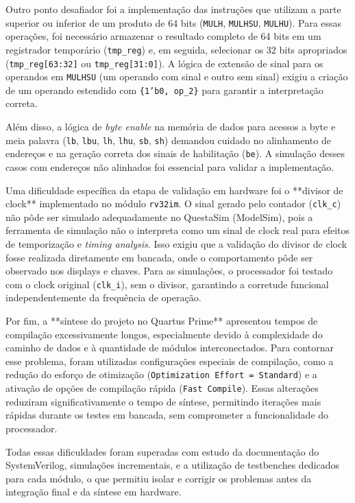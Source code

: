 \documentclass[
	12pt,				%
	oneside,
	a4paper,			%
	english,			%
	french,				%
	spanish,			%
	brazil,				%
	]{abntex2}
\begin{document}
Outro ponto desafiador foi a implementação das instruções que utilizam a parte superior ou inferior de um produto de 64 bits (\texttt{MULH}, \texttt{MULHSU}, \texttt{MULHU}). Para essas operações, foi necessário armazenar o resultado completo de 64 bits em um registrador temporário (\texttt{tmp\_reg}) e, em seguida, selecionar os 32 bits apropriados (\texttt{tmp\_reg[63:32]} ou \texttt{tmp\_reg[31:0]}). A lógica de extensão de sinal para os operandos em \texttt{MULHSU} (um operando com sinal e outro sem sinal) exigiu a criação de um operando estendido com \texttt{\{1'b0, op\_2\}} para garantir a interpretação correta.

Além disso, a lógica de \textit{byte enable} na memória de dados para acessos a byte e meia palavra (\texttt{lb}, \texttt{lbu}, \texttt{lh}, \texttt{lhu}, \texttt{sb}, \texttt{sh}) demandou cuidado no alinhamento de endereços e na geração correta dos sinais de habilitação (\texttt{be}). A simulação desses casos com endereços não alinhados foi essencial para validar a implementação.

Uma dificuldade específica da etapa de validação em hardware foi o **divisor de clock** implementado no módulo \texttt{rv32im}. O sinal gerado pelo contador (\texttt{clk\_c}) não pôde ser simulado adequadamente no QuestaSim (ModelSim), pois a ferramenta de simulação não o interpreta como um sinal de clock real para efeitos de temporização e \textit{timing analysis}. Isso exigiu que a validação do divisor de clock fosse realizada diretamente em bancada, onde o comportamento pôde ser observado nos displays e chaves. Para as simulações, o processador foi testado com o clock original (\texttt{clk\_i}), sem o divisor, garantindo a corretude funcional independentemente da frequência de operação.

Por fim, a **síntese do projeto no Quartus Prime** apresentou tempos de compilação excessivamente longos, especialmente devido à complexidade do caminho de dados e à quantidade de módulos interconectados. Para contornar esse problema, foram utilizadas configurações especiais de compilação, como a redução do esforço de otimização (\texttt{Optimization Effort = Standard}) e a ativação de opções de compilação rápida (\texttt{Fast Compile}). Essas alterações reduziram significativamente o tempo de síntese, permitindo iterações mais rápidas durante os testes em bancada, sem comprometer a funcionalidade do processador.

Todas essas dificuldades foram superadas com estudo da documentação do SystemVerilog, simulações incrementais, e a utilização de testbenches dedicados para cada módulo, o que permitiu isolar e corrigir os problemas antes da integração final e da síntese em hardware.


\postextual


\end{document}

